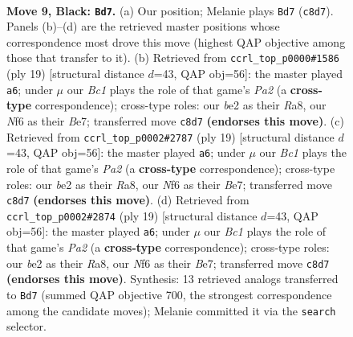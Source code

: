 \documentclass[11pt]{article}
\begin{document}
\clearpage

\begin{figure}[p]\centering
\begin{subfigure}{0.46\textwidth}\centering
\resizebox{\linewidth}{!}{%
\newchessgame
\chessboard[
  setfen={r1bq1rk1/pp2bppp/2n1pn2/2Pp4/3P4/2N2N2/PP2BPPP/R1BQ1RK1 b - - 4 9},
  showmover=false,
  pgfstyle=straightmove, color=movearrow, markmove={c8-d7}
]}
\caption{}
\end{subfigure}\hfill
\begin{subfigure}{0.46\textwidth}\centering
\resizebox{\linewidth}{!}{%
\newchessgame
\chessboard[
  setfen={r1bq1rk1/pp2bppp/2n2n2/3p4/2pP1B2/2N1P3/PPB1NPPP/R2Q1RK1 b - - 1 10},
  showmover=false,
  pgfstyle=straightmove, color=movearrow, markmove={a7-a6}
]}
\caption{}
\end{subfigure}
\\[4pt]
\begin{subfigure}{0.46\textwidth}\centering
\resizebox{\linewidth}{!}{%
\newchessgame
\chessboard[
  setfen={r1bq1rk1/pp2bppp/2n2n2/3p4/2pP1B2/2N1P3/PPB1NPPP/R2Q1RK1 b - - 1 10},
  showmover=false,
  pgfstyle=straightmove, color=movearrow, markmove={a7-a6}
]}
\caption{}
\end{subfigure}\hfill
\begin{subfigure}{0.46\textwidth}\centering
\resizebox{\linewidth}{!}{%
\newchessgame
\chessboard[
  setfen={r1bq1rk1/pp2bppp/2n2n2/3p4/2pP1B2/2N1P3/PPB1NPPP/R2Q1RK1 b - - 1 10},
  showmover=false,
  pgfstyle=straightmove, color=movearrow, markmove={a7-a6}
]}
\caption{}
\end{subfigure}
\caption{\textbf{Move 9, Black: \texttt{Bd7}.} (a) Our position; Melanie plays \texttt{Bd7} (\texttt{c8d7}). Panels (b)--(d) are the retrieved master positions whose correspondence most drove this move (highest QAP objective among those that transfer to it). (b) Retrieved from \texttt{ccrl\_top\_p0000\#1586} (ply 19) [structural distance $d$=43, QAP obj=56]: the master played \texttt{a6}; under $\mu$ our \emph{Bc1} plays the role of that game's \emph{Pa2} (a \textbf{cross-type} correspondence); cross-type roles: our \emph{b}e2 as their \emph{R}a8, our \emph{N}f6 as their \emph{B}e7; transferred move \texttt{c8d7} \textbf{(endorses this move)}. (c) Retrieved from \texttt{ccrl\_top\_p0002\#2787} (ply 19) [structural distance $d$=43, QAP obj=56]: the master played \texttt{a6}; under $\mu$ our \emph{Bc1} plays the role of that game's \emph{Pa2} (a \textbf{cross-type} correspondence); cross-type roles: our \emph{b}e2 as their \emph{R}a8, our \emph{N}f6 as their \emph{B}e7; transferred move \texttt{c8d7} \textbf{(endorses this move)}. (d) Retrieved from \texttt{ccrl\_top\_p0002\#2874} (ply 19) [structural distance $d$=43, QAP obj=56]: the master played \texttt{a6}; under $\mu$ our \emph{Bc1} plays the role of that game's \emph{Pa2} (a \textbf{cross-type} correspondence); cross-type roles: our \emph{b}e2 as their \emph{R}a8, our \emph{N}f6 as their \emph{B}e7; transferred move \texttt{c8d7} \textbf{(endorses this move)}. Synthesis: 13 retrieved analogs transferred to \texttt{Bd7} (summed QAP objective 700, the strongest correspondence among the candidate moves); Melanie committed it via the \texttt{search} selector.}

\end{figure}
\end{document}
